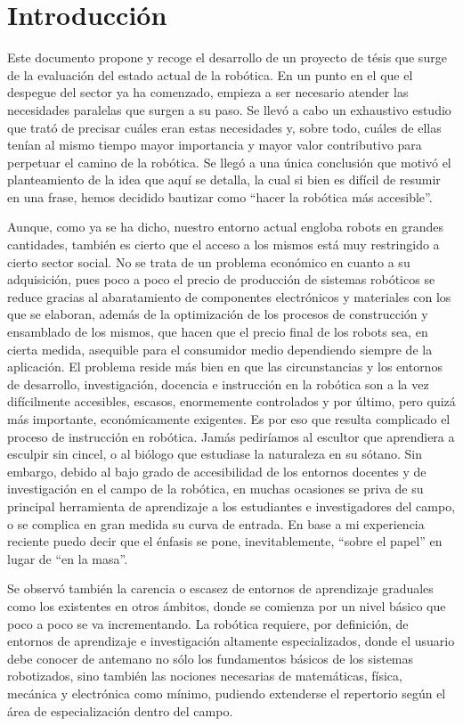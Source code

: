 \section{Introducción}

Este documento propone y recoge el desarrollo de un proyecto de tésis que surge de la evaluación del estado actual de la robótica. En un punto en el que el despegue del sector ya ha comenzado, empieza a ser necesario atender las necesidades paralelas que surgen a su paso. Se llevó a cabo un exhaustivo estudio que trató de precisar cuáles eran estas necesidades y, sobre todo, cuáles de  ellas tenían al mismo tiempo mayor importancia y mayor valor contributivo para perpetuar el camino de la robótica. Se llegó a una única conclusión que motivó el planteamiento de la idea que aquí se detalla, la cual si bien es difícil de resumir en una frase, hemos decidido bautizar como ``hacer la robótica más accesible''. 

Aunque, como ya se ha dicho, nuestro entorno actual engloba robots en grandes cantidades, también es cierto que el acceso a los mismos está muy restringido a cierto sector social. No se trata de un problema económico en cuanto a su adquisición, pues poco a poco el precio de producción de sistemas robóticos se reduce gracias al abaratamiento de componentes electrónicos y materiales con los que se elaboran, además de la optimización de los procesos de construcción y ensamblado de los mismos, que hacen que el precio final de los robots sea, en cierta medida, asequible para el consumidor medio dependiendo siempre de la aplicación. El problema reside más bien en que las circunstancias y los entornos de desarrollo, investigación, docencia e instrucción en la robótica son a la vez difícilmente accesibles, escasos, enormemente controlados y por último, pero quizá más importante, económicamente exigentes. Es por eso que resulta complicado el proceso de instrucción en robótica. Jamás pediríamos al escultor que aprendiera a esculpir sin cincel, o al biólogo que estudiase la naturaleza en su sótano. Sin embargo, debido al bajo grado de accesibilidad de los entornos docentes y de investigación en el campo de la robótica, en muchas ocasiones se priva de su principal herramienta de aprendizaje a los estudiantes e investigadores del campo, o se complica en gran medida su curva de entrada. En base a mi experiencia reciente puedo decir que el énfasis se pone, inevitablemente, ``sobre el papel'' en lugar de ``en la masa''.

Se observó también la carencia o escasez de entornos de aprendizaje graduales como los existentes en otros ámbitos, donde se comienza por un nivel básico que poco a poco se va incrementando. La robótica requiere, por definición, de entornos de aprendizaje e investigación altamente especializados, donde el usuario debe conocer de antemano no sólo los fundamentos básicos de los sistemas robotizados, sino también las nociones necesarias de matemáticas, física, mecánica y electrónica como mínimo, pudiendo extenderse el repertorio según el área de especialización dentro del campo.

